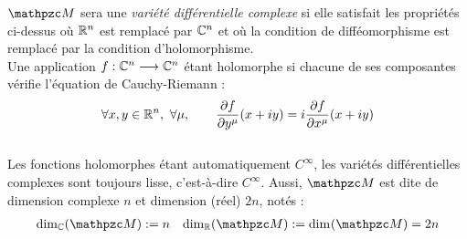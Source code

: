 \begin{annexe}
$\manu$ sera une \emph{variété différentielle complexe} si elle satisfait les propriétés ci-dessus où $\mathbb{R}^n$ est remplacé par $\mathbb{C}^n$ et où la condition de difféomorphisme est remplacé par la condition d'holomorphisme. 
\\
Une application $f : \mathbb{C}^n\longrightarrow \mathbb{C}^n$ étant holomorphe si chacune de ses composantes vérifie l'équation de Cauchy-Riemann :
\[\forall x,y\in\R^n,\ \forall \mu,\qquad \frac{\partial f }{\partial y^\mu}(x+iy) = i \frac{\partial f }{\partial x^\mu}(x+iy)\]
\\
Les fonctions holomorphes étant automatiquement $C^\infty$, les variétés différentielles complexes sont toujours lisse, c'est-à-dire $C^\infty$. Aussi, $\manu$ est dite de dimension complexe $n$ et dimension (réel) $2n$, notés :
\begin{align}\label{eq:manuC-base_cano}
	\dim[\C](\manu) &\defeq n  &  \dim[\R] (\manu) \defeq \dim (\manu) = 2n
\end{align}
\\


\end{annexe}
